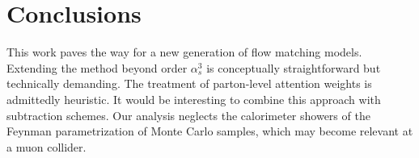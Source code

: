 \section{Conclusions}\label{sec:conclusions}

This work paves the way for a new generation of flow matching models.
Extending the method beyond order $\alpha_s^3$ is conceptually
straightforward but technically demanding. The treatment of parton-level
attention weights is admittedly heuristic. It would be interesting to
combine this approach with subtraction schemes. Our analysis neglects
the calorimeter showers of the Feynman parametrization of Monte Carlo
samples, which may become relevant at a muon collider.

